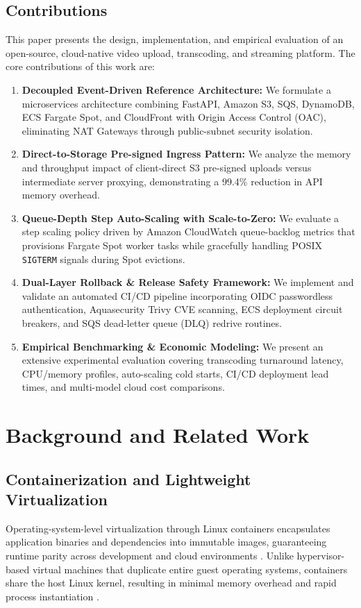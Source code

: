 \documentclass[conference]{IEEEtran}
\begin{document}
\subsection{Contributions}
This paper presents the design, implementation, and empirical evaluation of an open-source, cloud-native video upload, transcoding, and streaming platform. The core contributions of this work are:
\begin{enumerate}
    \item \textbf{Decoupled Event-Driven Reference Architecture:} We formulate a microservices architecture combining FastAPI, Amazon S3, SQS, DynamoDB, ECS Fargate Spot, and CloudFront with Origin Access Control (OAC), eliminating NAT Gateways through public-subnet security isolation.
    \item \textbf{Direct-to-Storage Pre-signed Ingress Pattern:} We analyze the memory and throughput impact of client-direct S3 pre-signed uploads versus intermediate server proxying, demonstrating a 99.4\% reduction in API memory overhead.
    \item \textbf{Queue-Depth Step Auto-Scaling with Scale-to-Zero:} We evaluate a step scaling policy driven by Amazon CloudWatch queue-backlog metrics that provisions Fargate Spot worker tasks while gracefully handling POSIX \texttt{SIGTERM} signals during Spot evictions.
    \item \textbf{Dual-Layer Rollback \& Release Safety Framework:} We implement and validate an automated CI/CD pipeline incorporating OIDC passwordless authentication, Aquasecurity Trivy CVE scanning, ECS deployment circuit breakers, and SQS dead-letter queue (DLQ) redrive routines.
    \item \textbf{Empirical Benchmarking \& Economic Modeling:} We present an extensive experimental evaluation covering transcoding turnaround latency, CPU/memory profiles, auto-scaling cold starts, CI/CD deployment lead times, and multi-model cloud cost comparisons.
\end{enumerate}

\section{Background and Related Work}

\subsection{Containerization and Lightweight Virtualization}
Operating-system-level virtualization through Linux containers encapsulates application binaries and dependencies into immutable images, guaranteeing runtime parity across development and cloud environments \cite{merkel}. Unlike hypervisor-based virtual machines that duplicate entire guest operating systems, containers share the host Linux kernel, resulting in minimal memory overhead and rapid process instantiation \cite{felter}.
\end{document}
